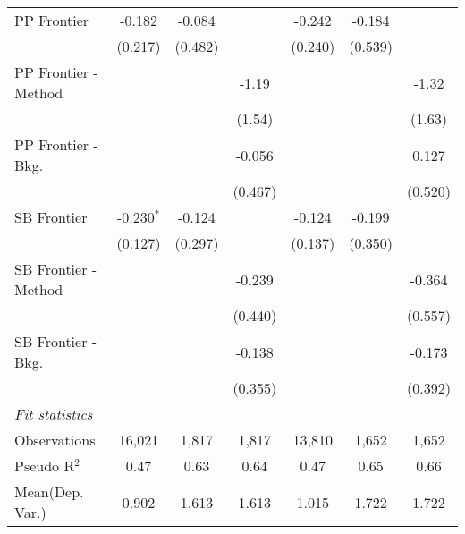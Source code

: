\begin{tabular}{lcccccc}
   PP Frontier          & -0.182        & -0.084       &               & -0.242       & -0.184        &   \\   
                        & (0.217)       & (0.482)      &               & (0.240)      & (0.539)       &   \\   
   PP Frontier - Method &               &              & -1.19         &              &               & -1.32\\   
                        &               &              & (1.54)        &              &               & (1.63)\\   
   PP Frontier - Bkg.   &               &              & -0.056        &              &               & 0.127\\   
                        &               &              & (0.467)       &              &               & (0.520)\\   
   SB Frontier          & -0.230$^{*}$  & -0.124       &               & -0.124       & -0.199        &   \\   
                        & (0.127)       & (0.297)      &               & (0.137)      & (0.350)       &   \\   
   SB Frontier - Method &               &              & -0.239        &              &               & -0.364\\   
                        &               &              & (0.440)       &              &               & (0.557)\\   
   SB Frontier - Bkg.   &               &              & -0.138        &              &               & -0.173\\   
                        &               &              & (0.355)       &              &               & (0.392)\\   
   \midrule
   \emph{Fit statistics}\\
   Observations         & 16,021        & 1,817        & 1,817         & 13,810       & 1,652         & 1,652\\  
   Pseudo R$^2$         & 0.47          & 0.63         & 0.64          & 0.47         & 0.65          & 0.66\\  
Mean(Dep. Var.) & 0.902 & 1.613 & 1.613 & 1.015 & 1.722 & 1.722 \\
   

\end{tabular}
